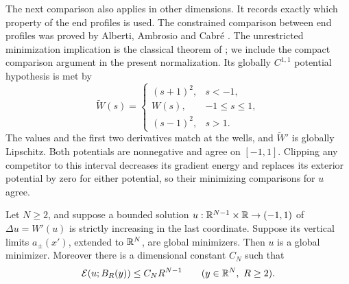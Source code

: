 The next comparison also applies in other dimensions.  It records exactly
which property of the end profiles is used.  The constrained comparison
between end profiles was proved by Alberti, Ambrosio and Cabr\'e
\cite[Theorem~4.4]{AlbertiAmbrosioCabre2001}.  The unrestricted
minimization implication is the classical theorem of
\citet[Theorem~1.3, p.~441; proof on pp.~452--453]{JerisonMonneau2004};
we include the compact comparison argument in the present normalization.
Its globally $C^{1,1}$ potential hypothesis is met by
\[
 \widetilde W(s)=
 \begin{cases}
  (s+1)^2,&s<-1,\\
  W(s),&-1\le s\le1,\\
  (s-1)^2,&s>1.
 \end{cases}
\]
The values and the first two derivatives match at the wells, and
$\widetilde W'$ is globally Lipschitz.  Both potentials are nonnegative
and agree on $[-1,1]$.  Clipping any competitor to this interval decreases
its gradient energy and replaces its exterior potential by zero for
either potential, so their minimizing comparisons for $u$ agree.

\begin{lemma}
\label{lem:monotone-minimizer}
Let $N\ge2$, and suppose a bounded solution
$u:\mathbb R^{N-1}\times\mathbb R\to(-1,1)$ of $\Delta u=W'(u)$ is strictly
increasing in the last coordinate.  Suppose its vertical limits
$a_\pm(x')$, extended to $\mathbb R^N$, are global minimizers.  Then $u$ is a
global minimizer.  Moreover there is a dimensional constant $C_N$ such
that
\begin{equation}
 \mathcal E(u;B_R(y))\le C_N R^{N-1}
 \qquad (y\in\mathbb R^N,\ R\ge2).
 \label{eq:monotone-energy-growth}
\end{equation}
\end{lemma}


